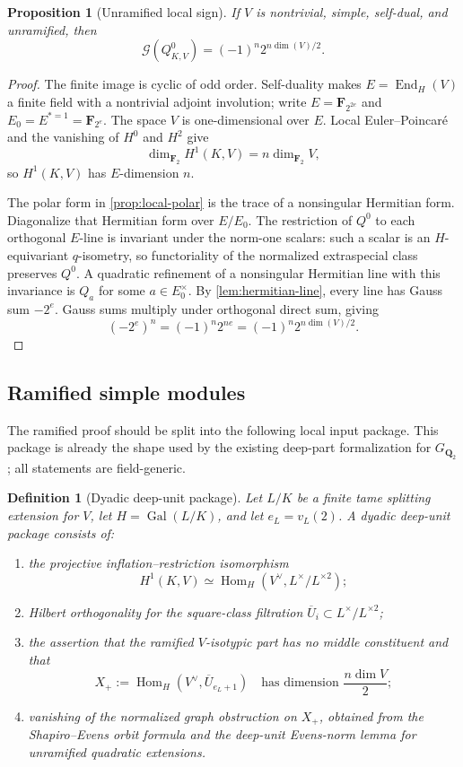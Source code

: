 \documentclass[11pt,reqno]{amsart}
\newtheorem{proposition}[theorem]{Proposition}
\newtheorem{definition}[theorem]{Definition}
\theoremstyle{remark}
\numberwithin{equation}{section}
\newcommand{\Q}{\mathbf Q}
\newcommand{\F}{\mathbf F}
\newcommand{\Gal}{\operatorname{Gal}}
\newcommand{\Hom}{\operatorname{Hom}}
\newcommand{\Gsum}{\mathcal G}
\begin{document}
\begin{proposition}[Unramified local sign]\label{prop:unramified-sign}
If \(V\) is nontrivial, simple, self-dual, and unramified, then
\[
 \Gsum(Q^0_{K,V})=(-1)^n2^{n\dim(V)/2}.
\]
\end{proposition}

\begin{proof}
The finite image is cyclic of odd order.  Self-duality makes
\(E=\operatorname{End}_H(V)\) a finite field with a nontrivial adjoint
involution; write \(E=\F_{2^{2e}}\) and
\(E_0=E^{*=1}=\F_{2^e}\).  The space \(V\) is one-dimensional over
\(E\).  Local Euler--Poincar\'e and the vanishing of \(H^0\) and \(H^2\)
give
\[
 \dim_{\F_2}H^1(K,V)=n\dim_{\F_2}V,
\]
so \(H^1(K,V)\) has \(E\)-dimension \(n\).

The polar form in \cref{prop:local-polar} is the trace of a nonsingular
Hermitian form.  Diagonalize that Hermitian form over \(E/E_0\).  The
restriction of \(Q^0\) to each orthogonal \(E\)-line is invariant under
the norm-one scalars: such a scalar is an \(H\)-equivariant \(q\)-isometry,
so functoriality of the normalized extraspecial class preserves \(Q^0\).
A quadratic refinement of a nonsingular Hermitian line with this
invariance is \(Q_a\) for some \(a\in E_0^\times\).  By
\cref{lem:hermitian-line}, every line has Gauss sum \(-2^e\).  Gauss sums
multiply under orthogonal direct sum, giving
\[
 (-2^e)^n=(-1)^n2^{ne}=(-1)^n2^{n\dim(V)/2}.
\]
\end{proof}

\subsection{Ramified simple modules}

The ramified proof should be split into the following local input package.
This package is already the shape used by the existing deep-part
formalization for \(G_{\Q_2}\); all statements are field-generic.

\begin{definition}[Dyadic deep-unit package]\label{def:deep-package}
Let \(L/K\) be a finite tame splitting extension for \(V\), let
\(H=\Gal(L/K)\), and let \(e_L=v_L(2)\).  A dyadic deep-unit package
consists of:
\begin{enumerate}
\item the projective inflation--restriction isomorphism
\[
 H^1(K,V)\simeq
 \Hom_H(V^\vee,L^\times/L^{\times2});
\]
\item Hilbert orthogonality for the square-class filtration
\(\overline U_i\subset L^\times/L^{\times2}\);
\item the assertion that the ramified \(V\)-isotypic part has no middle
constituent and that
\[
 X_+:=\Hom_H(V^\vee,\overline U_{e_L+1})
\quad\text{has dimension }\frac{n\dim V}{2};
\]
\item vanishing of the normalized graph obstruction on \(X_+\), obtained
from the Shapiro--Evens orbit formula and the deep-unit Evens-norm lemma
for unramified quadratic extensions.
\end{enumerate}
\end{definition}
\end{document}
